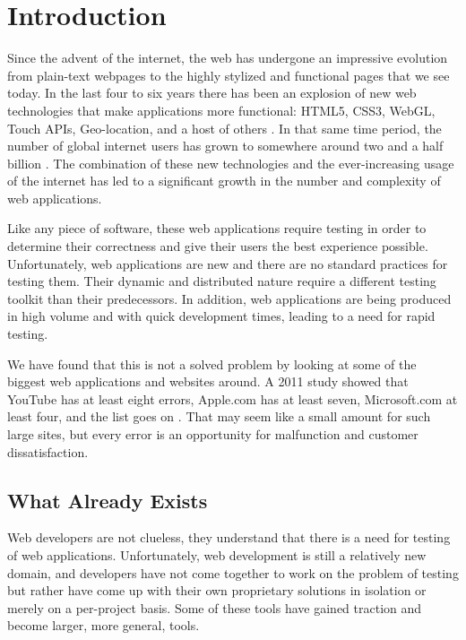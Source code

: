 \documentclass[12pt]{ucthesis}
\begin{document}
\pagestyle{plain}

\renewcommand{\baselinestretch}{1.66}

\chapter{Introduction}
Since the advent of the internet, the web has undergone an impressive evolution from plain-text webpages to the highly stylized and functional pages that we see today. In the last four to six years there has been an explosion of new web technologies that make applications more functional: HTML5, CSS3, WebGL, Touch APIs, Geo-location, and a host of others \cite{EvolutionOfWeb}. In that same time period, the number of global internet users has grown to somewhere around two and a half billion \cite{EvolutionOfWeb}. The combination of these new technologies and the ever-increasing usage of the internet has led to a significant growth in the number and complexity of web applications.

Like any piece of software, these web applications require testing in order to determine their correctness and give their users the best experience possible. Unfortunately, web applications are new and there are no standard practices for testing them. Their dynamic and distributed nature require a different testing toolkit than their predecessors. In addition, web applications are being produced in high volume and with quick development times, leading to a need for rapid testing.

We have found that this is not a solved problem by looking at some of the biggest web applications and websites around. A 2011 study showed that YouTube has at least eight errors, Apple.com has at least seven, Microsoft.com at least four, and the list goes on \cite{ErrorsInTheWild}. That may seem like a small amount for such large sites, but every error is an opportunity for malfunction and customer dissatisfaction.

\section{What Already Exists}
Web developers are not clueless, they understand that there is a need for testing of web applications. Unfortunately, web development is still a relatively new domain, and developers have not come together to work on the problem of testing but rather have come up with their own proprietary solutions in isolation or merely on a per-project basis. Some of these tools have gained traction and become larger, more general, tools.
\end{document}
